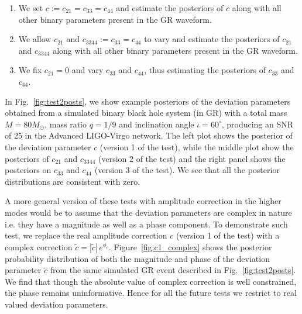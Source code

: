 \documentclass[prd,preprintnumbers,twocolumn,eqsecnum,floatfix,a4paper,nofootinbib,superscriptaddress]{revtex4}
\begin{document}
\begin{enumerate}
\item We set $c := c_{21} = c_{33} = c_{44}$ and estimate the posteriors of $c$ along with all other binary parameters present in the GR waveform.  
\item We allow $c_{21}$ and $c_{3344} := c_{33} = c_{44} $ to vary and estimate the posteriors of $c_{21}$ and $c_{3344}$ along with all other binary parameters present in the GR waveform.  
\item We fix $c_{21} = 0$ and vary $c_{33}$ and $c_{44}$, thus estimating the posteriors of $c_{33}$ and $c_{44}$. 
\end{enumerate}

In Fig.~\ref{fig:test2posts}, we show example posteriors of the deviation parameters obtained from a simulated binary black hole system (in GR) with  a total mass $M = 80M_{\odot}$, mass ratio $q=1/9$ and inclination angle $ {\iota}=60^{\circ} $, producing an SNR of 25 in the Advanced LIGO-Virgo network. The left plot shows the posterior of the deviation parameter $c$ (version 1 of the test), while the middle plot show the posteriors of $c_{21}$ and $c_{3344}$ (version 2 of the test) and the right panel shows the posteriors on $c_{33}$ and $c_{44}$  (version 3 of the test). We see that all the posterior distributions are consistent with zero. 

A more general version of these tests with amplitude correction in the higher modes would be to assume that the deviation parameters are complex in nature i.e. they have a magnitude as well as a phase component. To demonstrate such test, we replace the real amplitude correction $c$ (version 1 of the test) with a complex correction $\tilde{c} = |\tilde{c}| \, e^{\phi_c}$. Figure~\ref{fig:c1_complex} shows the posterior probability distribution of both the magnitude and phase of the deviation parameter $\tilde{c}$ from the same simulated GR event described in Fig.~\ref{fig:test2posts}. We find that though the absolute value of complex correction is well constrained, the phase remains uninformative. Hence for all the future tests we restrict to real valued deviation parameters. 
\end{document}
